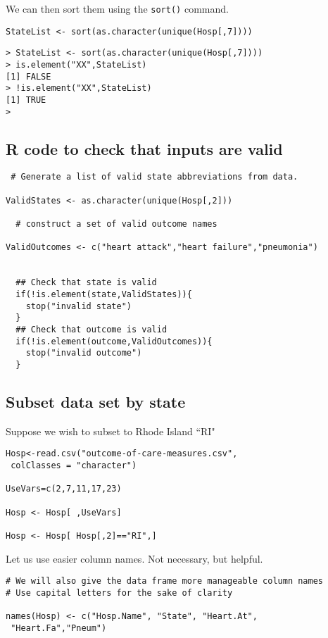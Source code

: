 \documentclass[]{article}
\begin{document}
We can then sort them using the \texttt{sort()} command.

\begin{framed}
\begin{verbatim}
StateList <- sort(as.character(unique(Hosp[,7])))
\end{verbatim}
\end{framed}

\newpage

\begin{verbatim}
> StateList <- sort(as.character(unique(Hosp[,7])))
> is.element("XX",StateList)
[1] FALSE
> !is.element("XX",StateList)
[1] TRUE
>
\end{verbatim}
\newpage

\subsection{R code to check that inputs are valid}

\begin{framed}
\begin{verbatim}
 # Generate a list of valid state abbreviations from data.

ValidStates <- as.character(unique(Hosp[,2]))

  # construct a set of valid outcome names

ValidOutcomes <- c("heart attack","heart failure","pneumonia")


  ## Check that state is valid
  if(!is.element(state,ValidStates)){
    stop("invalid state")
  }
  ## Check that outcome is valid
  if(!is.element(outcome,ValidOutcomes)){
    stop("invalid outcome")
  }

\end{verbatim}
\end{framed}

\subsection{Subset data set by  state}


Suppose we wish to subset to Rhode Island ``RI"
\begin{framed}
\begin{verbatim}
Hosp<-read.csv("outcome-of-care-measures.csv",
 colClasses = "character") 

UseVars=c(2,7,11,17,23)

Hosp <- Hosp[ ,UseVars]

Hosp <- Hosp[ Hosp[,2]=="RI",]
\end{verbatim}
\end{framed}
\newpage
Let us use easier column names. Not necessary, but helpful.
\begin{framed}
\begin{verbatim}
# We will also give the data frame more manageable column names
# Use capital letters for the sake of clarity

names(Hosp) <- c("Hosp.Name", "State", "Heart.At",
 "Heart.Fa","Pneum")
\end{verbatim}
\end{framed}
\end{document}
